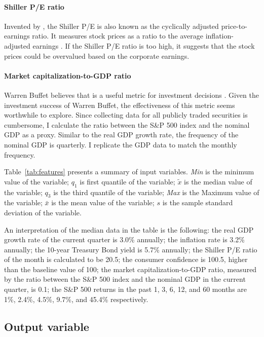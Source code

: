 \documentclass[12pt, man, a4paper, floatsintext]{apa7}
\begin{document}
\paragraph{Shiller P/E ratio} Invented by \textcite{shiller2015IE}, the Shiller P/E is also known as the cyclically adjusted price-to-earnings ratio. It measures stock prices as a ratio to the average inflation-adjusted earnings \parencite{shillerPE}. If the Shiller P/E ratio is too high, it suggests that the stock prices could be overvalued based on the corporate earnings. 

\paragraph{Market capitalization-to-GDP ratio} Warren Buffet believes that  is a useful metric for investment decisions \parencite{buffett}. Given the investment success of Warren Buffet, the effectiveness of this metric seems worthwhile to explore. Since collecting data for all publicly traded securities is cumbersome, I calculate the ratio between the S\&P 500 index and the nominal GDP as a proxy. Similar to the real GDP growth rate, the frequency of the nominal GDP is quarterly. I replicate the GDP data to match the monthly frequency.

Table~\ref{tab:features} presents a summary of input variables. \emph{Min} is the minimum value of the variable; $q_1$ is first quantile of the variable; $\tilde{x}$ is the median value of the variable; $q_3$ is the third quantile of the variable; \emph{Max} is the Maximum value of the variable; $\bar{x}$ is the mean value of the variable; $s$ is the sample standard deviation of the variable.



An interpretation of the median data in the table is the following: the real GDP growth rate of the current quarter is 3.0\% annually; the inflation rate is 3.2\% annually; the 10-year Treasury Bond yield is 5.7\% annually; the Shiller P/E ratio of the month is calculated to be 20.5; the consumer confidence is 100.5, higher than the baseline value of 100; the market capitalization-to-GDP ratio, measured by the ratio between the S\&P 500 index and the nominal GDP in the current quarter, is 0.1; the S\&P 500 returns in the past 1, 3, 6, 12, and 60 months are 1\%, 2.4\%, 4.5\%, 9.7\%, and 45.4\% respectively. 

\subsection{Output variable}
\end{document}
